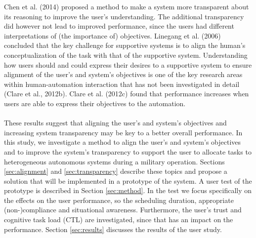 \documentclass[twoside,twocolumn]{article}
\begin{document}
Chen et al. (2014) proposed a method to make a system more transparent about its reasoning to improve the user's understanding. The additional transparency did however not lead to improved performance, since the users had different interpretations of (the importance of) objectives. Linegang et al. (2006) concluded that the key challenge for supportive systems is to align the human's conceptualization of the task with that of the supportive system. Understanding how users should and could express their desires to a supportive system to ensure alignment of the user's and system's objectives is one of the key research areas within human-automation interaction that has not been investigated in detail (Clare et al., 2012b). Clare et al. (2012c) found that performance increases when users are able to express their objectives to the automation. 
\\\\
These results suggest that aligning the user's and system's objectives and increasing system transparency may be key to a better overall performance. In this study, we investigate a method to align the user's and system's objectives and to improve the system's transparency to support the user to allocate tasks to heterogeneous autonomous systems during a military operation. Sections \ref{sec:alignment} and \ref{sec:transparency} describe these topics and propose a solution that will be implemented in a prototype of the system. A user test of the prototype is described in Section \ref{sec:method}. In the test we focus specifically on the effects on the user performance, so the scheduling duration, appropriate (non-)compliance and situational awareness. Furthermore, the user's trust and cognitive task load (CTL) are investigated, since that has an impact on the performance. Section \ref{sec:results} discusses the results of the user study. 
%

\end{document}
